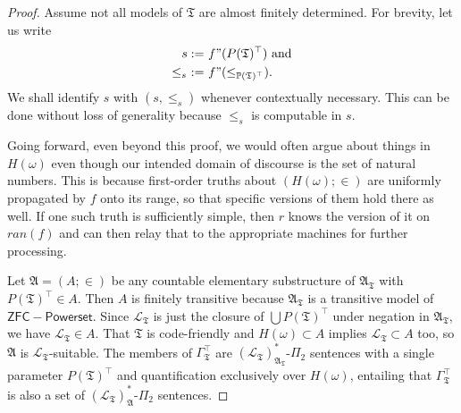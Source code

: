 \documentclass[12pt, twoside]{memoir}
\numberwithin{equation}{section}
\theoremstyle{definition}
\theoremstyle{remark}
\theoremstyle{definition}
\theoremstyle{definition}
\theoremstyle{definition}
\theoremstyle{remark}
\begin{document}
\begin{proof}
Assume not all models of $\mathfrak{T}$ are almost finitely determined. For brevity, let us write
\begin{align*}
    s := \ & f" (P(\mathfrak{T})^{\top}) \text{ and} \\
    \leq_s \ := \ & f" (\leq_{\mathbb{P}(\mathfrak{T})^{\top}}) \text{.}
\end{align*} 
We shall identify $s$ with $(s, \leq_s)$ whenever contextually necessary. This can be done without loss of generality because $\leq_s$ is computable in $s$.

Going forward, even beyond this proof, we would often argue about things in $H(\omega)$ even though our intended domain of discourse is the set of natural numbers. This is because first-order truths about $(H(\omega); \in)$ are uniformly propagated by $f$ onto its range, so that specific versions of them hold there as well. If one such truth is sufficiently simple, then $r$ knows the version of it on $ran(f)$ and can then relay that to the appropriate machines for further processing. 

Let $\mathfrak{A} = (A; \in)$ be any countable elementary substructure of $\mathfrak{A}_{\mathfrak{T}}$ with $P(\mathfrak{T})^{\top} \in A$. Then $A$ is finitely transitive because $\mathfrak{A}_{\mathfrak{T}}$ is a transitive model of $\mathsf{ZFC - Powerset}$. Since $\mathcal{L}_{\mathfrak{T}}$ is just the closure of $\bigcup P(\mathfrak{T})^{\top}$ under negation in $\mathfrak{A}_{\mathfrak{T}}$, we have $\mathcal{L}_{\mathfrak{T}} \in A$. That $\mathfrak{T}$ is code-friendly and $H(\omega) \subset A$ implies $\mathcal{L}_{\mathfrak{T}} \subset A$ too, so $\mathfrak{A}$ is $\mathcal{L}_{\mathfrak{T}}$-suitable. The members of $\Gamma_{\mathfrak{T}}^{\top}$ are $(\mathcal{L}_{\mathfrak{T}})^*_{\mathfrak{A}_{\mathfrak{T}}}$-$\Pi_2$ sentences with a single parameter $P(\mathfrak{T})^{\top}$ and quantification exclusively over $H(\omega)$, entailing that $\Gamma_{\mathfrak{T}}^{\top}$ is also a set of $(\mathcal{L}_{\mathfrak{T}})^*_{\mathfrak{A}}$-$\Pi_2$ sentences. 


\end{proof}
\end{document}

